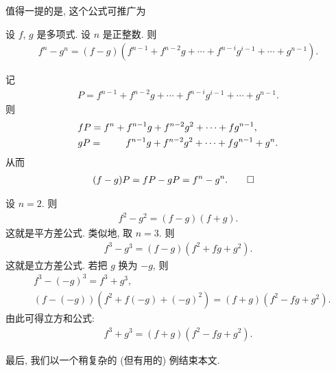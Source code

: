 值得一提的是, 这个公式可推广为
\begin{proposition}
    设 $f$, $g$ 是多项式. 设 $n$ 是正整数. 则
    \begin{align*}
        f^n - g^n = (f - g)(f^{n-1} + f^{n-2} g + \cdots + f^{n-i} g^{i-1} + \cdots + g^{n-1}).
    \end{align*}
\end{proposition}

\begin{pf}
    记
    \begin{align*}
        P = f^{n-1} + f^{n-2} g + \cdots + f^{n-i} g^{i-1} + \cdots + g^{n-1}.
    \end{align*}
    则
    \begin{align*}
         & fP = f^n + f^{n-1} g + f^{n-2} g^2 + \cdots + fg^{n-1},                    \\
         & gP = \hphantom{f^n + {}} f^{n-1}g + f^{n-2} g^2 + \cdots + fg^{n-1} + g^n.
    \end{align*}
    从而
    \begin{align*}
         & (f - g)P = fP - gP = f^n - g^n. \qedhere
    \end{align*}
\end{pf}

\begin{example}
    设 $n = 2$. 则
    \begin{align*}
        f^2 - g^2 = (f - g)(f + g).
    \end{align*}
    这就是平方差公式. 类似地, 取 $n = 3$. 则
    \begin{align*}
        f^3 - g^3 = (f - g)(f^2 + fg + g^2).
    \end{align*}
    这就是立方差公式. 若把 $g$ 换为 $-g$, 则
    \begin{align*}
         & f^3 - (-g)^3 = f^3 + g^3,                                   \\
         & (f - (-g))(f^2 + f(-g) + (-g)^2) = (f + g)(f^2 - fg + g^2).
    \end{align*}
    由此可得立方和公式:
    \begin{align*}
        f^3 + g^3 = (f + g)(f^2 - fg + g^2).
    \end{align*}
\end{example}

最后, 我们以一个稍复杂的 (但有用的) 例结束本文.


